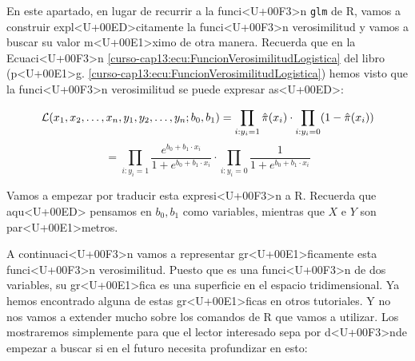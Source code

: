 \documentclass[10pt,a4paper]{article}
\newcounter {cont01}
\begin{document}
En este apartado, en lugar de recurrir a la funci<U+00F3>n {\tt glm} de R, vamos a construir expl<U+00ED>citamente la funci<U+00F3>n verosimilitud y vamos a buscar su valor m<U+00E1>ximo de otra manera. Recuerda que en la Ecuaci<U+00F3>n \ref{curso-cap13:ecu:FuncionVerosimilitudLogistica} del libro (p<U+00E1>g. \ref{curso-cap13:ecu:FuncionVerosimilitudLogistica}) hemos visto que la funci<U+00F3>n verosimilitud se puede expresar as<U+00ED>:

\[
{\cal L}(x_1,x_2,\ldots,x_n, y_1, y_2, \ldots, y_n;b_0, b_1) =\prod_{i:y_i=1}\hat{\pi}(x_i)  \cdot \prod_{i:y_i=0}(1 - \hat{\pi}(x_i))
\]
\[
=\prod_{i:y_i=1} \dfrac{e^{b_0+b_1\cdot x_i}}{1+e^{b_0+b_1\cdot x_i}}
\cdot \prod_{i:y_i=0}\dfrac{1}{1+e^{b_0+b_1\cdot x_i}}
\]

Vamos a empezar por traducir esta expresi<U+00F3>n a R. Recuerda que aqu<U+00ED> pensamos en $b_0, b_1$ como variables, mientras que $X$ e $Y$ son par<U+00E1>metros.

\begin{knitrout}
\color{fgcolor}\begin{kframe}
\begin{alltt}
 \hlkwb{=} \hlstd{(}\hlstd{)\{}
    \hlstd{(}\hlstd{(b[}\hlstd{]} \hlopt{+} \hlstd{b[}\hlstd{]} \hlopt{*} \hlstd{X[Y}\hlopt{==}\hlstd{])} \hlopt{/}\hlstd{(} \hlopt{+} \hlstd{(b[}\hlstd{]} \hlopt{+} \hlstd{b[}\hlstd{]} \hlopt{*} \hlstd{X[Y}\hlopt{==}\hlstd{])))} \hlopt{*}
    \hlstd{(} \hlopt{/}\hlstd{(} \hlopt{+} \hlstd{(b[}\hlstd{]} \hlopt{+} \hlstd{b[}\hlstd{]} \hlopt{*} \hlstd{X[Y}\hlopt{==}\hlstd{])))}
\hlstd{\}}
\end{alltt}
\end{kframe}
\end{knitrout}

A continuaci<U+00F3>n vamos a representar gr<U+00E1>ficamente esta funci<U+00F3>n verosimilitud. Puesto que es una funci<U+00F3>n de dos variables, su gr<U+00E1>fica es una superficie en el espacio tridimensional. Ya hemos encontrado alguna de estas gr<U+00E1>ficas en otros tutoriales. Y no nos vamos a extender mucho sobre los comandos de R que vamos a utilizar. Los mostraremos simplemente para que el lector interesado sepa por d<U+00F3>nde empezar a buscar si en el futuro necesita profundizar en esto:
\end{document}
